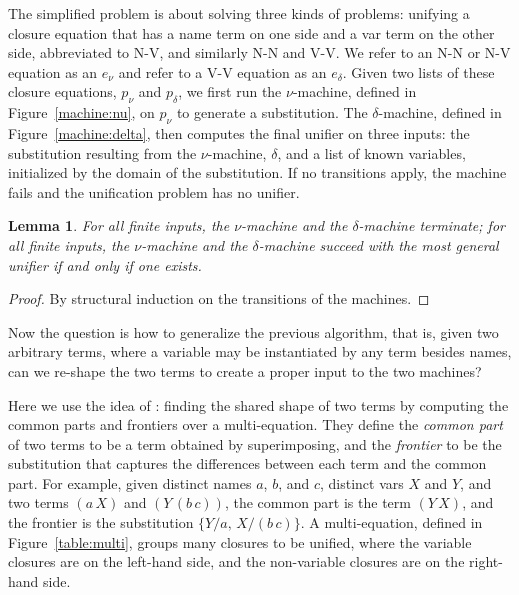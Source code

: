 \documentclass{easychair}
\newtheorem{lemm}{Lemma}[section]
\newcommand{\bd}[2] {
 #1/ #2
}
\newcommand*{\transname}[1]{\textsc{#1}}
\begin{document}
The simplified problem is about solving three kinds of problems:
unifying a closure equation that has a name term on one side
and a var term on the other side,
abbreviated to \transname{N-V},
and similarly \transname{N-N} and \transname{V-V}.
We refer to an \transname{N-N} or \transname{N-V} equation as
an \emph{$e_\nu$} and refer to a
\transname{V-V} equation as an \emph{$e_\delta$}.
Given two lists of these closure equations,
$p_\nu$ and $p_\delta$,
we first run the
$\nu$-machine, defined in Figure~\ref{machine:nu},
on $p_\nu$ to generate a substitution.
The $\delta$-machine, defined in Figure~\ref{machine:delta},
then computes the final unifier on three inputs:
the substitution resulting from the $\nu$-machine,
$\delta$, and a list of known variables, initialized by
the domain of the substitution.
If no transitions apply, the machine
fails and the unification problem has no unifier.


\begin{lemm}\label{lemma:numachine}
 For all finite inputs, the $\nu$-machine and the $\delta$-machine terminate;
 for all finite inputs, the $\nu$-machine and the $\delta$-machine
 succeed with the most general unifier if and only if one exists.
\end{lemm}
\begin{proof}
By structural induction on the transitions of the machines.
\end{proof}

\clearpage

Now the question is how to generalize the previous algorithm, that is,
given two arbitrary terms, where a variable may be instantiated by any
term besides names, can we re-shape the two terms to create a proper
input to the two machines?

Here we use the idea of \citet{martelli_efficient_1982}:
finding the shared shape of two terms by computing
the common parts and frontiers over a multi-equation.
They define the \emph{common part} of two terms to be
a term obtained by superimposing,
and the \emph{frontier} to be the substitution that
captures the differences between each term and the common part.
For example, given distinct names $a$, $b$, and $c$,
distinct vars $X$ and $Y$,
and two terms $(a\,X)$ and $(Y\,(b\,c))$,
the common part is the term $(Y\,X)$,
and the frontier is the substitution $\{\bd{Y}{a},\,\bd{X}{(b\,c)}\}$.
A multi-equation, defined in Figure~\ref{table:multi}, groups many closures to be unified,
where the variable closures are on the left-hand side,
and the non-variable closures are on the right-hand side.
\end{document}

